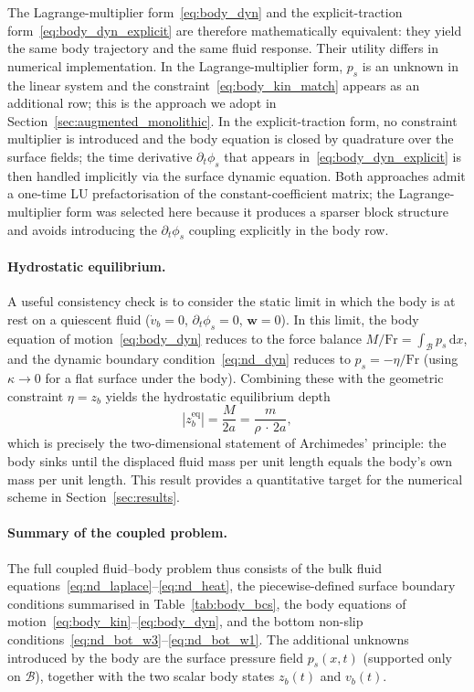 \documentclass{article}
\newcommand{\Fr}{\mathrm{Fr}}
\newcommand{\ww}{\mathbf{w}}
\begin{document}
The Lagrange-multiplier form~\eqref{eq:body_dyn} and the explicit-traction form~\eqref{eq:body_dyn_explicit} are therefore mathematically equivalent: they yield the same body trajectory and the same fluid response.
Their utility differs in numerical implementation.
In the Lagrange-multiplier form, $p_s$ is an unknown in the linear system and the constraint~\eqref{eq:body_kin_match} appears as an additional row; this is the approach we adopt in Section~\ref{sec:augmented_monolithic}.
\color{black}
In the explicit-traction form, no constraint multiplier is introduced and the body equation is closed by quadrature over the surface fields; the time derivative $\partial_t \phi_s$ that appears in~\eqref{eq:body_dyn_explicit} is then handled implicitly via the surface dynamic equation.
Both approaches admit a one-time LU prefactorisation of the constant-coefficient matrix; the Lagrange-multiplier form was selected here because it produces a sparser block structure and avoids introducing the $\partial_t \phi_s$ coupling explicitly in the body row.

\paragraph{Hydrostatic equilibrium.}
A useful consistency check is to consider the static limit in which the body is at rest on a quiescent fluid ($\dot{v}_b = 0$, $\partial_t \phi_s = 0$, $\ww = 0$).
In this limit, the body equation of motion~\eqref{eq:body_dyn} reduces to the force balance $M/\Fr = \int_{\mathcal{B}} p_s\,\mathrm{d} x$, and the dynamic boundary condition~\eqref{eq:nd_dyn} reduces to $p_s = -\eta/\Fr$ (using $\kappa \to 0$ for a flat surface under the body).
Combining these with the geometric constraint $\eta = z_b$ yields the hydrostatic equilibrium depth
\begin{equation}
    |z_b^{\mathrm{eq}}| = \frac{M}{2a} = \frac{m}{\rho\,\cdot\,2a},
    \label{eq:hydrostatic}
\end{equation}
which is precisely the two-dimensional statement of Archimedes' principle: the body sinks until the displaced fluid mass per unit length equals the body's own mass per unit length.
This result provides a quantitative target for the numerical scheme in Section~\ref{sec:results}.

\paragraph{Summary of the coupled problem.}
The full coupled fluid--body problem thus consists of the bulk fluid equations~\eqref{eq:nd_laplace}--\eqref{eq:nd_heat}, the piecewise-defined surface boundary conditions summarised in Table~\ref{tab:body_bcs}, the body equations of motion~\eqref{eq:body_kin}--\eqref{eq:body_dyn}, and the bottom non-slip conditions~\eqref{eq:nd_bot_w3}--\eqref{eq:nd_bot_w1}.
The additional unknowns introduced by the body are the surface pressure field $p_s(x, t)$ (supported only on $\mathcal{B}$), together with the two scalar body states $z_b(t)$ and $v_b(t)$.
\end{document}
